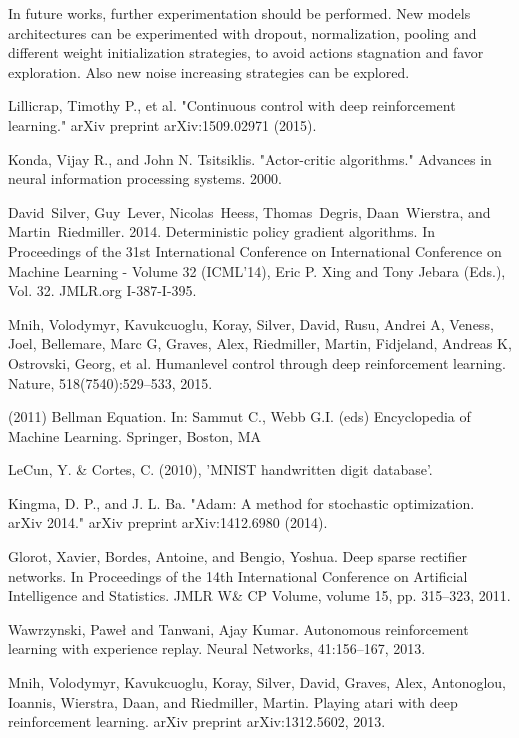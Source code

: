 \documentclass[peerreview,onecolumn]{IEEEtran}
\begin{document}
	In future works, further experimentation should be performed. New models architectures can be experimented with dropout, normalization, pooling and different weight initialization strategies, to avoid actions stagnation and favor exploration. Also new noise increasing strategies can be explored.
 

\begin{thebibliography}{1}

  Lillicrap, Timothy P., et al. "Continuous control with deep reinforcement learning." arXiv preprint arXiv:1509.02971 (2015).
  
  Konda, Vijay R., and John N. Tsitsiklis. "Actor-critic algorithms." Advances in neural information processing systems. 2000.
  
  David~Silver, Guy~Lever, Nicolas~Heess, Thomas~Degris, Daan~Wierstra, and Martin~Riedmiller. 2014. Deterministic policy gradient algorithms. In Proceedings of the 31st International Conference on International Conference on Machine Learning - Volume 32 (ICML'14), Eric P. Xing and Tony Jebara (Eds.), Vol. 32. JMLR.org I-387-I-395.
  
  
  Mnih, Volodymyr, Kavukcuoglu, Koray, Silver, David, Rusu, Andrei A, Veness, Joel, Bellemare,
Marc G, Graves, Alex, Riedmiller, Martin, Fidjeland, Andreas K, Ostrovski, Georg, et al. Humanlevel control through deep reinforcement learning. Nature, 518(7540):529–533, 2015.


(2011) Bellman Equation. In: Sammut C., Webb G.I. (eds) Encyclopedia of Machine Learning. Springer, Boston, MA


	LeCun, Y. \& Cortes, C. (2010), 'MNIST handwritten digit database'.
	
	Kingma, D. P., and J. L. Ba. "Adam: A method for stochastic optimization. arXiv 2014." arXiv preprint arXiv:1412.6980 (2014).
	
	Glorot, Xavier, Bordes, Antoine, and Bengio, Yoshua. Deep sparse rectifier networks. In Proceedings of the 14th International Conference on Artificial Intelligence and Statistics. JMLR W\& CP Volume, volume 15, pp. 315–323, 2011.
	
	
	Wawrzynski, Paweł and Tanwani, Ajay Kumar. Autonomous reinforcement learning with experience replay. Neural Networks, 41:156–167, 2013.
	
	Mnih, Volodymyr, Kavukcuoglu, Koray, Silver, David, Graves, Alex, Antonoglou, Ioannis, Wierstra, Daan, and Riedmiller, Martin. Playing atari with deep reinforcement learning. arXiv preprint arXiv:1312.5602, 2013.
	 
\end{thebibliography}

\end{document}
